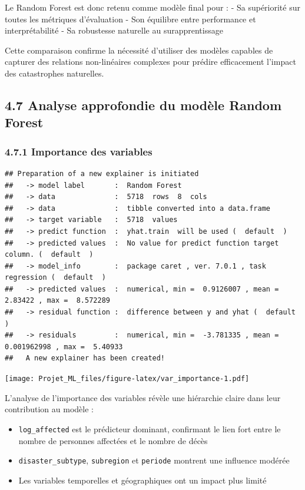 \documentclass[
]{article}
\begin{document}
Le Random Forest est donc retenu comme modèle final pour : - Sa
supériorité sur toutes les métriques d'évaluation - Son équilibre entre
performance et interprétabilité - Sa robustesse naturelle au
surapprentissage

Cette comparaison confirme la nécessité d'utiliser des modèles capables
de capturer des relations non-linéaires complexes pour prédire
efficacement l'impact des catastrophes naturelles.

\subsection{4.7 Analyse approfondie du modèle Random
Forest}\label{analyse-approfondie-du-moduxe8le-random-forest}

\subsubsection{4.7.1 Importance des
variables}\label{importance-des-variables}

\begin{verbatim}
## Preparation of a new explainer is initiated
##   -> model label       :  Random Forest 
##   -> data              :  5718  rows  8  cols 
##   -> data              :  tibble converted into a data.frame 
##   -> target variable   :  5718  values 
##   -> predict function  :  yhat.train  will be used (  default  )
##   -> predicted values  :  No value for predict function target column. (  default  )
##   -> model_info        :  package caret , ver. 7.0.1 , task regression (  default  ) 
##   -> predicted values  :  numerical, min =  0.9126007 , mean =  2.83422 , max =  8.572289  
##   -> residual function :  difference between y and yhat (  default  )
##   -> residuals         :  numerical, min =  -3.781335 , mean =  0.001962998 , max =  5.40933  
##   A new explainer has been created!
\end{verbatim}

\texttt{[image: Projet\_ML\_files/figure-latex/var\_importance-1.pdf]}

L'analyse de l'importance des variables révèle une hiérarchie claire
dans leur contribution au modèle :

\begin{itemize}
\item
  \texttt{log\_affected} est le prédicteur dominant, confirmant le lien
  fort entre le nombre de personnes affectées et le nombre de décès
\item
  \texttt{disaster\_subtype}, \texttt{subregion} et \texttt{periode}
  montrent une influence modérée
\item
  Les variables temporelles et géographiques ont un impact plus limité
\end{itemize}
\end{document}
